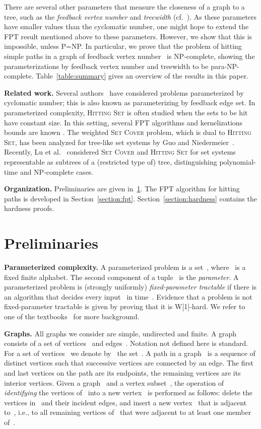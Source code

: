 \let\accentvec\vec  \documentclass{llncs}
\newcommand{\HittingSet}{\textsc{Hitting Set}\xspace}
\newcommand{\SetCover}{\textsc{Set Cover}\xspace}
\begin{document}
There are several other parameters that measure the closeness of a graph to a tree, such as the \emph{feedback vertex number} and \emph{treewidth} (cf.~\cite{FellowsJR13}). As these parameters have smaller values than the cyclomatic number, one might hope to extend the FPT result mentioned above to these parameters. However, we show that this is impossible, unless P=NP. In particular, we prove that the problem of hitting simple paths in a graph of feedback vertex number~ is NP-complete, showing the parameterizations by feedback vertex number and treewidth to be para-NP-complete. Table~\ref{table:summary} gives an overview of the results in this paper.

\textbf{Related work.} Several authors~\cite{CoppersmithV85,Fiala01,UhlmannW13} have considered problems parameterized by cyclomatic number; this is also known as parameterizing by feedback edge set. In parameterized complexity, \HittingSet is often studied when the sets to be hit have constant size. In this setting, several FPT algorithms and kernelizations bounds are known \cite{Abu-Khzam10,DellM14,Wahlstrom07}. The weighted \SetCover problem, which is dual to \HittingSet, has been analyzed for tree-like set systems by Guo and Niedermeier~\cite{GuoN06}. Recently, Lu et al.~\cite{LuLTLX14} considered \SetCover and \HittingSet for set systems representable as subtrees of a (restricted type of) tree, distinguishing polynomial-time and NP-complete cases.

\textbf{Organization.} Preliminaries are given in~\ref{section:prelims}. The FPT algorithm for hitting paths is developed in Section~\ref{section:fpt}. Section~\ref{section:hardness} contains the hardness proofs.

\section{Preliminaries} \label{section:prelims}

\textbf{Parameterized complexity.}
A parameterized problem is a set~, where~ is a fixed finite alphabet. The second component of a tuple~ is the \emph{parameter}. A parameterized problem is (strongly uniformly) \emph{fixed-parameter tractable} if there is an algorithm that decides every input~ in time~. Evidence that a problem is not fixed-parameter tractable is given by proving that it is W[1]-hard. We refer to one of the textbooks~\cite{DowneyF13,FlumG06} for more background.

\textbf{Graphs.}
All graphs we consider are simple, undirected and finite. A graph~ consists of a set of vertices~ and edges~. Notation not defined here is standard. For a set of vertices~ we denote by~ the set~. A path in a graph~ is a sequence of distinct vertices such that successive vertices are connected by an edge. The first and last vertices on the path are its endpoints, the remaining vertices are its interior vertices. Given a graph~ and a vertex subset~, the operation of \emph{identifying} the vertices of~ into a new vertex~ is performed as follows: delete the vertices in~ and their incident edges, and insert a new vertex~ that is adjacent to~, i.e., to all remaining vertices of~ that were adjacent to at least one member of~.
\end{document}
